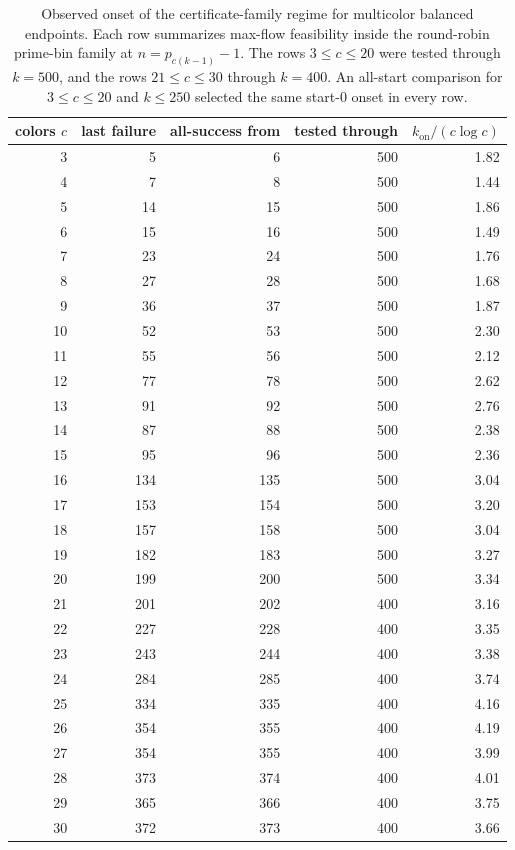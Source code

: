 \documentclass[11pt]{article}
\theoremstyle{plain}
\theoremstyle{definition}
\theoremstyle{remark}
\begin{document}
\begin{table}[htbp]
\centering
\caption{Observed onset of the certificate-family regime for multicolor
balanced endpoints.  Each row summarizes max-flow feasibility inside the
round-robin prime-bin family at $n=p_{c(k-1)}-1$.  The rows $3\le c\le20$
were tested through $k=500$, and the rows $21\le c\le30$ through $k=400$.
An all-start comparison for $3\le c\le20$ and $k\le250$ selected the same
start-$0$ onset in every row.}
\label{tab:balanced-multicolor-phase}
\small
\begin{tabular}{@{}rrrrr@{}}
\toprule
colors $c$ & last failure & all-success from & tested through & $k_{\mathrm{on}}/(c\log c)$ \\
\midrule
3 & 5 & 6 & 500 & 1.82 \\
4 & 7 & 8 & 500 & 1.44 \\
5 & 14 & 15 & 500 & 1.86 \\
6 & 15 & 16 & 500 & 1.49 \\
7 & 23 & 24 & 500 & 1.76 \\
8 & 27 & 28 & 500 & 1.68 \\
9 & 36 & 37 & 500 & 1.87 \\
10 & 52 & 53 & 500 & 2.30 \\
11 & 55 & 56 & 500 & 2.12 \\
12 & 77 & 78 & 500 & 2.62 \\
13 & 91 & 92 & 500 & 2.76 \\
14 & 87 & 88 & 500 & 2.38 \\
15 & 95 & 96 & 500 & 2.36 \\
16 & 134 & 135 & 500 & 3.04 \\
17 & 153 & 154 & 500 & 3.20 \\
18 & 157 & 158 & 500 & 3.04 \\
19 & 182 & 183 & 500 & 3.27 \\
20 & 199 & 200 & 500 & 3.34 \\
21 & 201 & 202 & 400 & 3.16 \\
22 & 227 & 228 & 400 & 3.35 \\
23 & 243 & 244 & 400 & 3.38 \\
24 & 284 & 285 & 400 & 3.74 \\
25 & 334 & 335 & 400 & 4.16 \\
26 & 354 & 355 & 400 & 4.19 \\
27 & 354 & 355 & 400 & 3.99 \\
28 & 373 & 374 & 400 & 4.01 \\
29 & 365 & 366 & 400 & 3.75 \\
30 & 372 & 373 & 400 & 3.66 \\
\bottomrule
\end{tabular}

\end{table}
\end{document}
